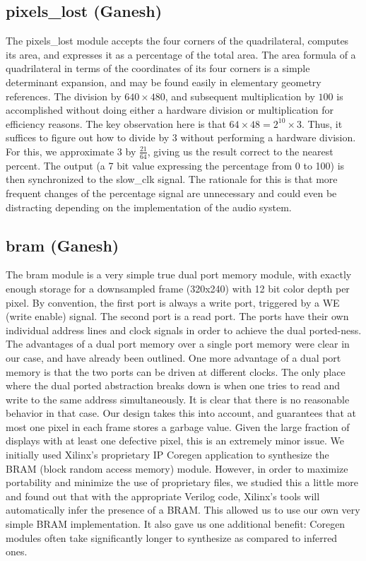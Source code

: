 \documentclass{article}
\begin{document}
\subsection{pixels\_lost (Ganesh)}
The pixels\_lost module accepts the four corners of the quadrilateral, computes its area, and expresses it as a percentage of the total area.
The area formula of a quadrilateral in terms of the coordinates of its four corners is a simple determinant expansion,
and may be found easily in elementary geometry references.
The division by $640 \times 480$,
and subsequent multiplication by $100$ is accomplished without doing either a hardware division or multiplication for efficiency reasons.
The key observation here is that $64 \times 48 = 2^{10} \times 3$.
Thus, it suffices to figure out how to divide by $3$ without performing a hardware division.
For this, we approximate $3$ by $\frac{21}{64}$, giving us the result correct to the nearest percent.
The output (a 7 bit value expressing the percentage from 0 to 100) is then synchronized to the slow\_clk signal.
The rationale for this is that more frequent changes of the percentage signal are unnecessary
and could even be distracting depending on the implementation of the audio system.

\subsection{bram (Ganesh)}
The bram module is a very simple true dual port memory module,
with exactly enough storage for a downsampled frame (320x240) with 12 bit color depth per pixel.
By convention, the first port is always a write port, triggered by a WE (write enable) signal.
The second port is a read port.
The ports have their own individual address lines and clock signals in order to achieve the dual ported-ness.
The advantages of a dual port memory over a single port memory were clear in our case, and have already been outlined.
One more advantage of a dual port memory is that the two ports can be driven at different clocks.
The only place where the dual ported abstraction breaks down is when one tries to read and write to the same address simultaneously.
It is clear that there is no reasonable behavior in that case.
Our design takes this into account, and guarantees that at most one pixel in each frame stores a garbage value.
Given the large fraction of displays with at least one defective pixel, this is an extremely minor issue.
We initially used Xilinx's proprietary IP Coregen application to synthesize the BRAM (block random access memory) module.
However, in order to maximize portability and minimize the use of proprietary files,
we studied this a little more and found out that with the appropriate Verilog code, Xilinx's tools will automatically infer the presence of a BRAM.
This allowed us to use our own very simple BRAM implementation.
It also gave us one additional benefit: Coregen modules often take significantly longer to synthesize as compared to inferred ones.
\end{document}
